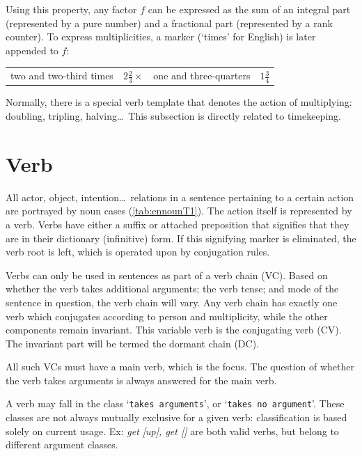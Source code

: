 Using this property, any factor $f$ can be expressed as the sum of an integral part (represented by a pure number) and a fractional part (represented by a rank counter). To express  multiplicities, a marker (`times' for English) is later  appended to $f$:
\begin{example}
    \begin{tabular}{cc|cc}
two and two-third times & $2\frac{2}{3}\times$ & one and three-quarters & $1\frac{3}{4}$ 
    \end{tabular}
\end{example}
Normally, there is  a special verb template that denotes the action of multiplying: doubling, tripling, halving\ldots\, This subsection is directly related to timekeeping.


\section{Verb} \label{sec:enverb}
All actor, object, intention\ldots\, relations in a sentence pertaining to a certain action are portrayed by noun cases (\autoref{tab:ennounT1}). The action itself is  represented by a verb. Verbs have either a suffix or attached preposition that signifies that they are in their dictionary (infinitive) form. If this signifying marker is eliminated, the verb root is left, which is operated upon by conjugation rules. 

Verbs can only be used in sentences as part of a verb chain (VC). Based on whether the verb takes additional arguments;  the verb tense; and mode of the sentence in question,  the verb chain will vary. Any verb chain has exactly one verb which conjugates according to person and multiplicity, while the other components remain invariant. This variable verb is  the conjugating verb (CV). The invariant part will be termed the dormant chain (DC). 


All such VCs must have a main verb, which is the focus. The question of whether the verb takes arguments is always answered for the main verb. 

A verb may fall in the class `\texttt{takes arguments}', or `\texttt{takes no argument}'. These classes  are not always mutually exclusive for a given verb:  classification is based solely on  current usage.  Ex: \textit{get [up], get []} are both valid verbs, but belong to different argument classes.


